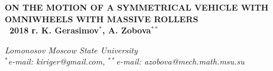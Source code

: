 




% 
\newpage
\begin{center}
\large
\textbf{ ON THE MOTION OF A SYMMETRICAL VEHICLE WITH OMNIWHEELS WITH MASSIVE ROLLERS \\
\textcopyright \ 2018 г. \quad K. Gerasimov$^{*}$, A. Zobova$^{**}$ }

\textit{ Lomonosov Moscow State University \\
$^*$e-mail: kiriger@gmail.com, $^{**}$e-mail: azobova@mech.math.msu.su }
\end{center}




